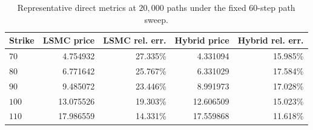 \begin{table}[htbp]
\centering
\caption{Representative direct metrics at $20{,}000$ paths under the fixed 60-step path sweep.}
\label{tab:bgk_r05_v0114_vp009_t1_delta05_nex12-path60-path20k}
\begin{tabular}{lrrrr}
\toprule
Strike & LSMC price & LSMC rel. err. & Hybrid price & Hybrid rel. err. \\
\midrule
$70$ & 4.754932 & 27.335\% & 4.331094 & 15.985\% \\
$80$ & 6.771642 & 25.767\% & 6.331029 & 17.584\% \\
$90$ & 9.485072 & 23.446\% & 8.991973 & 17.028\% \\
$100$ & 13.075526 & 19.303\% & 12.606509 & 15.023\% \\
$110$ & 17.986559 & 14.331\% & 17.559868 & 11.618\% \\
\bottomrule
\end{tabular}
\end{table}

